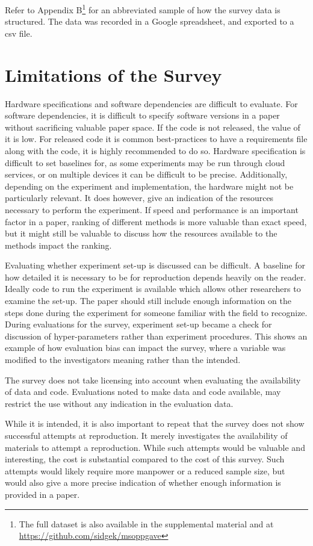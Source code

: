 Refer to Appendix B\footnote{The full dataset is also available in the supplemental material and at \url{https://github.com/sidgek/msoppgave}} for an abbreviated sample of how the survey data is structured. The data was recorded in a Google spreadsheet, and exported to a csv file.

\section{Limitations of the Survey}
Hardware specifications and software dependencies are difficult to evaluate. For software dependencies, it is difficult to specify software versions in a paper without sacrificing valuable paper space. If the code is not released, the value of it is low. For released code it is common best-practices to have a requirements file along with the code, it is highly recommended to do so. Hardware specification is difficult to set baselines for, as some experiments may be run through cloud services, or on multiple devices it can be difficult to be precise. Additionally, depending on the experiment and implementation, the hardware might not be particularly relevant. It does however, give an indication of the resources necessary to perform the experiment. If speed and performance is an important factor in a paper, ranking of different methods is more valuable than exact speed, but it might still be valuable to discuss how the resources available to the methods impact the ranking.

Evaluating whether experiment set-up is discussed can be difficult. A baseline for how detailed it is necessary to be for reproduction depends heavily on the reader. Ideally code to run the experiment is available which allows other researchers to examine the set-up. The paper should still include enough information on the steps done during the experiment for someone familiar with the field to recognize. During evaluations for the survey, experiment set-up became a check for discussion of hyper-parameters rather than experiment procedures. This shows an example of how evaluation bias can impact the survey, where a variable was modified to the investigators meaning rather than the intended.

The survey does not take licensing into account when evaluating the availability of data and code. Evaluations noted to make data and code available, may restrict the use without any indication in the evaluation data.

While it is intended, it is also important to repeat that the survey does not show successful attempts at reproduction. It merely investigates the availability of materials to attempt a reproduction. While such attempts would be valuable and interesting, the cost is substantial compared to the cost of this survey. Such attempts would likely require more manpower or a reduced sample size, but would also give a more precise indication of whether enough information is provided in a paper.
\cleardoublepage
